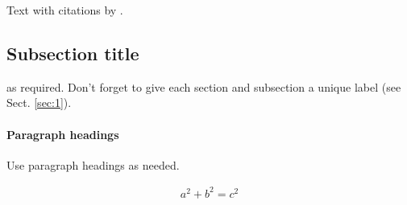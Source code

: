 \documentclass[smallextended]{svjour3}       %
\begin{document}
Text with citations by \cite{Galyardt14mmm}.

\hypertarget{sec:2}{%
\subsection{Subsection title}\label{sec:2}}

as required. Don't forget to give each section and subsection a unique
label (see Sect. \ref{sec:1}).

\hypertarget{paragraph-headings}{%
\paragraph{Paragraph headings}\label{paragraph-headings}}

Use paragraph headings as needed.

\begin{align}
a^2+b^2=c^2
\end{align}



\end{document}
